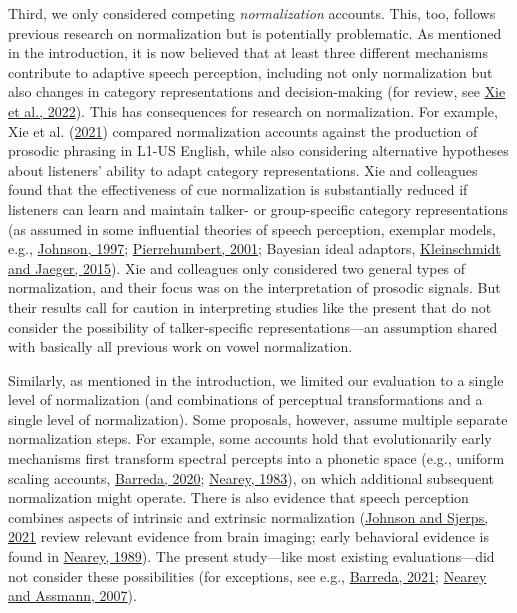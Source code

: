 \documentclass[utf8]{frontiersSCNS}
\begin{document}
Third, we only considered competing \emph{normalization} accounts. This, too, follows previous research on normalization but is potentially problematic. As mentioned in the introduction, it is now believed that at least three different mechanisms contribute to adaptive speech perception, including not only normalization but also changes in category representations and decision-making (for review, see \protect\hyperlink{ref-xie2022}{Xie et al., 2022}). This has consequences for research on normalization. For example, Xie et al. (\protect\hyperlink{ref-xie2021cognition}{2021}) compared normalization accounts against the production of prosodic phrasing in L1-US English, while also considering alternative hypotheses about listeners' ability to adapt category representations. Xie and colleagues found that the effectiveness of cue normalization is substantially reduced if listeners can learn and maintain talker- or group-specific category representations (as assumed in some influential theories of speech perception, exemplar models, e.g., \protect\hyperlink{ref-johnson1997}{Johnson, 1997}; \protect\hyperlink{ref-pierrehumbert2001}{Pierrehumbert, 2001}; Bayesian ideal adaptors, \protect\hyperlink{ref-kleinschmidt-jaeger2015}{Kleinschmidt and Jaeger, 2015}). Xie and colleagues only considered two general types of normalization, and their focus was on the interpretation of prosodic signals. But their results call for caution in interpreting studies like the present that do not consider the possibility of talker-specific representations---an assumption shared with basically all previous work on vowel normalization.

Similarly, as mentioned in the introduction, we limited our evaluation to a single level of normalization (and combinations of perceptual transformations and a single level of normalization). Some proposals, however, assume multiple separate normalization steps. For example, some accounts hold that evolutionarily early mechanisms first transform spectral percepts into a phonetic space (e.g., uniform scaling accounts, \protect\hyperlink{ref-barreda2020a}{Barreda, 2020}; \protect\hyperlink{ref-nearey1983}{Nearey, 1983}), on which additional subsequent normalization might operate. There is also evidence that speech perception combines aspects of intrinsic and extrinsic normalization (\protect\hyperlink{ref-johnson-sjerps2021}{Johnson and Sjerps, 2021} review relevant evidence from brain imaging; early behavioral evidence is found in \protect\hyperlink{ref-nearey1989}{Nearey, 1989}). The present study---like most existing evaluations---did not consider these possibilities (for exceptions, see e.g., \protect\hyperlink{ref-barreda2021}{Barreda, 2021}; \protect\hyperlink{ref-nearey2007}{Nearey and Assmann, 2007}).
\end{document}
